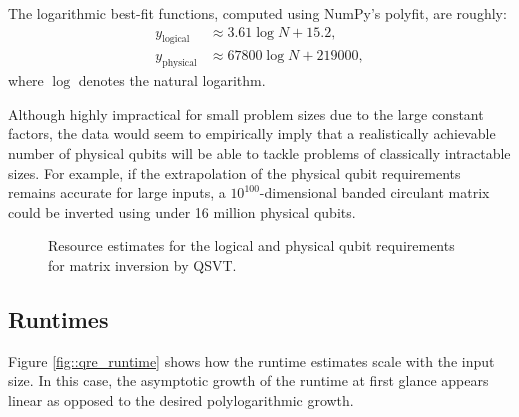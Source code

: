 \documentclass[10pt, twocolumn]{article}
\begin{document}
The logarithmic best-fit functions, computed using NumPy's polyfit, are roughly:
\begin{align*}
	y_\text{logical} &\approx 3.61 \log{N} + 15.2, \\
	y_\text{physical} &\approx 67800 \log{N} + 219000,
\end{align*}
where $\log$ denotes the natural logarithm.

Although highly impractical for small problem sizes due to the large constant factors, the data would seem to empirically imply that a realistically achievable number of physical qubits will be able to tackle problems of classically intractable sizes. For example, if the extrapolation of the physical qubit requirements remains accurate for large inputs, a $10^{100}$-dimensional banded circulant matrix could be inverted using under 16 million physical qubits.

\begin{figure}
	\centering
	\caption{Resource estimates for the logical and physical qubit requirements for matrix inversion by QSVT.}
	\label{fig::qre_qubits}
\end{figure}

\subsection{Runtimes}

Figure \ref{fig::qre_runtime} shows how the runtime estimates scale with the input size. In this case, the asymptotic growth of the runtime at first glance appears linear as opposed to the desired polylogarithmic growth.
\end{document}
